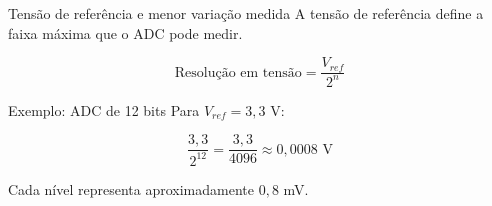 \begin{frame}{Tensão de referência e menor variação medida}
    A tensão de referência define a faixa máxima que o ADC pode medir.

    \[
        \text{Resolução em tensão} =
        \frac{V_{ref}}{2^n}
    \]

    \begin{exampleblock}{Exemplo: ADC de 12 bits}
        Para $V_{ref} = 3{,}3$ V:

        \[
            \frac{3{,}3}{2^{12}} =
            \frac{3{,}3}{4096}
            \approx 0{,}0008 \text{ V}
        \]

        Cada nível representa aproximadamente $0{,}8$ mV.
    \end{exampleblock}
\end{frame}
